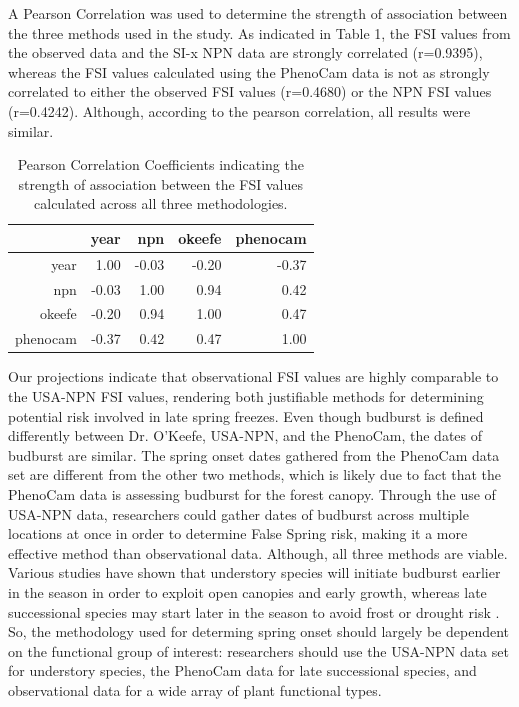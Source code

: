 \documentclass{article}\usepackage[]{graphicx}\usepackage[]{color}
\begin{document}
A Pearson Correlation was used to determine the strength of association between the three methods used in the study. As indicated in Table 1, the FSI values from the observed data and the SI-x NPN data are strongly correlated (r=0.9395), whereas the FSI values calculated using the PhenoCam data is not as strongly correlated to either the observed FSI values (r=0.4680) or the NPN FSI values (r=0.4242). Although, according to the pearson correlation, all results were similar. 

\begin{table}[ht]
\centering
\caption{Pearson Correlation Coefficients indicating the strength of association between the FSI values calculated across all three methodologies.} 
\begin{tabular}{rrrrr}
  \hline
 & year & npn & okeefe & phenocam \\ 
  \hline
year & 1.00 & -0.03 & -0.20 & -0.37 \\ 
  npn & -0.03 & 1.00 & 0.94 & 0.42 \\ 
  okeefe & -0.20 & 0.94 & 1.00 & 0.47 \\ 
  phenocam & -0.37 & 0.42 & 0.47 & 1.00 \\ 
   \hline
\end{tabular}
\end{table}


Our projections indicate that observational FSI values are highly comparable to the USA-NPN FSI values, rendering both justifiable methods for determining potential risk involved in late spring freezes. Even though budburst is defined differently between Dr. O'Keefe, USA-NPN, and the PhenoCam, the dates of budburst are similar. The spring onset dates gathered from the PhenoCam data set are different from the other two methods, which is likely due to fact that the PhenoCam data is assessing budburst for the forest canopy. Through the use of USA-NPN data, researchers could gather dates of budburst across multiple locations at once in order to determine False Spring risk, making it a more effective method than observational data. Although, all three methods are viable. Various studies have shown that understory species will initiate budburst earlier in the season in order to exploit open canopies and early growth, whereas late successional species may start later in the season to avoid frost or drought risk \citep{Xin2016, Richardson2009}. So, the methodology used for determing spring onset should largely be dependent on the functional group of interest: researchers should use the USA-NPN data set for understory species, the PhenoCam data for late successional species, and observational data for a wide array of plant functional types. 
\end{document}

